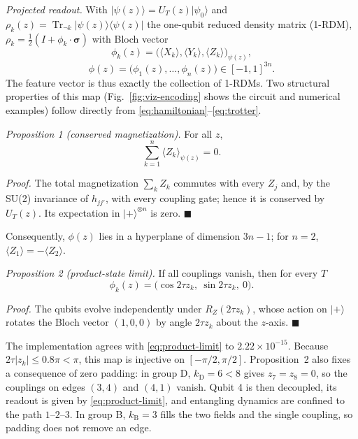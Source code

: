 \documentclass[conference]{IEEEtran}
\begin{document}
\textit{Projected readout.} With $|\psi(z)\rangle=U_T(z)|\psi_0\rangle$ and $\rho_k(z)=\operatorname{Tr}_{\neg k}|\psi(z)\rangle\langle\psi(z)|$ the one-qubit reduced density matrix (1-RDM), $\rho_k=\tfrac12(I+\phi_k\cdot\boldsymbol{\sigma})$ with Bloch vector
\begin{equation}
    \phi_k(z)=\big(\langle X_k\rangle,\langle Y_k\rangle,\langle Z_k\rangle\big)_{\psi(z)},
\end{equation}
\begin{equation}
    \phi(z)=\big(\phi_1(z),\dots,\phi_n(z)\big)\in[-1,1]^{3n}.
    \label{eq:readout}
\end{equation}
The feature vector is thus exactly the collection of 1-RDMs. Two structural properties of this map (Fig.~\ref{fig:viz-encoding} shows the circuit and numerical examples) follow directly from \eqref{eq:hamiltonian}--\eqref{eq:trotter}.

\textit{Proposition 1 (conserved magnetization).} For all $z$,
\[
    \sum_{k=1}^{n}\langle Z_k\rangle_{\psi(z)}=0.
\]

\textit{Proof.} The total magnetization $\sum_k Z_k$ commutes with every $Z_j$ and, by the SU(2) invariance of $h_{jj'}$, with every coupling gate; hence it is conserved by $U_T(z)$. Its expectation in $|{+}\rangle^{\otimes n}$ is zero. $\blacksquare$

Consequently, $\phi(z)$ lies in a hyperplane of dimension $3n-1$; for $n=2$, $\langle Z_1\rangle=-\langle Z_2\rangle$.

\textit{Proposition 2 (product-state limit).} If all couplings vanish, then for every $T$
\begin{equation}
    \phi_k(z)=\big(\cos 2\tau z_k,\ \sin 2\tau z_k,\ 0\big).
    \label{eq:product-limit}
\end{equation}

\textit{Proof.} The qubits evolve independently under $R_Z(2\tau z_k)$, whose action on $|{+}\rangle$ rotates the Bloch vector $(1,0,0)$ by angle $2\tau z_k$ about the $z$-axis. $\blacksquare$

The implementation agrees with \eqref{eq:product-limit} to $2.22\times10^{-15}$. Because $2\tau|z_k|\le0.8\pi<\pi$, this map is injective on $[-\pi/2,\pi/2]$. Proposition~2 also fixes a consequence of zero padding: in group D, $k_{\mathrm{D}}=6<8$ gives $z_7=z_8=0$, so the couplings on edges $(3,4)$ and $(4,1)$ vanish. Qubit 4 is then decoupled, its readout is given by \eqref{eq:product-limit}, and entangling dynamics are confined to the path $1$--$2$--$3$. In group B, $k_{\mathrm{B}}=3$ fills the two fields and the single coupling, so padding does not remove an edge.
\end{document}
